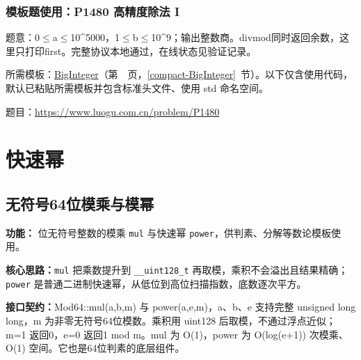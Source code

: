 

\newpage

\Needspace{251pt}

\subsection*{模板题使用：P1480 高精度除法 I}

\label{usage-example-421}

题意：0$\le$a$\le$10\textasciicircum{}5000，1$\le$b$\le$10\textasciicircum{}9；输出整数商。divmod同时返回余数，这里只打印first。完整协议本地通过，在线状态见验证记录。

所需模板：\hyperref[compact-BigInteger]{BigInteger}（第~\pageref{compact-BigInteger}~页，\ref{compact-BigInteger}~节）。以下仅含使用代码，默认已粘贴所需模板并包含标准头文件、使用 std 命名空间。

题目：\url{https://www.luogu.com.cn/problem/P1480}



\Needspace{383pt}

\chapter{快速幂}

\section{无符号64位模乘与模幂}\label{compact-Mod64}

\noindent\textbf{功能：} 位无符号整数的模乘 \texttt{mul} 与快速幂 \texttt{power}，供判素、分解等数论模板使用。

\textbf{核心思路：}\allowbreak \texttt{mul} 把乘数提升到 \texttt{\_\_uint128\_t} 再取模，乘积不会溢出且结果精确；\texttt{power} 是普通二进制快速幂，从低位到高位扫描指数，底数逐次平方。



{\sloppy{}\noindent\textbf{接口契约：}Mod64::mul(a,b,m) 与 power(a,e,m)，a、b、e 支持完整 unsigned long long，m 为非零无符号64位模数。乘积用 uint128 后取模，不通过浮点近似；m=1 返回0，e=0 返回1 mod m。mul 为 O(1)，power 为 O(log(e+1)) 次模乘、O(1) 空间。它也是64位判素的底层组件。\par}



